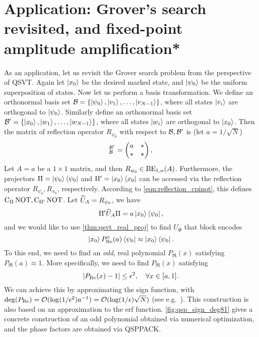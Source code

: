 \section{Application: Grover's search revisited, and fixed-point amplitude amplification*}\label{sec:appqsvt_grover}

As an application, let us revisit the Grover search problem from the perspective of QSVT.
Again let $\ket{x_0}$ be the desired marked state, and $\ket{\psi_0}$ be the uniform superposition of states.
Now let us perform a basis transformation. 
We define an orthonormal basis set $\mathcal{B}=\{\ket{\psi_0},\ket{v_1},\ldots,\ket{v_{N-1}}\}$, where all states $\ket{v_i}$ are orthogonal to $\ket{\psi_0}$. 
Similarly define an orthonormal basis set $\mathcal{B}'=\{\ket{x_0},\ket{w_1},\ldots,\ket{w_{N-1}}\}$, where all states $\ket{w_i}$ are orthogonal to $\ket{x_0}$.
Then the matrix of reflection operator $R_{\psi_0}$ with respect to $\mathcal{B},\mathcal{B'}$ is (let $a=1/\sqrt{N}$)
\begin{equation}
[R_{\psi_0}]_{\mc{B}}^{\mc{B}'}=\begin{pmatrix}
a & *\\
* & *
\end{pmatrix},
\end{equation}
Let $A=a$ be a $1\times 1$ matrix, and then $R_{\psi_0}\in \operatorname{BE}_{1,n}(A)$.
Furthermore, the projectors $\Pi=\ket{\psi_0}\bra{\psi_0}$ and $\Pi'=\ket{x_0}\bra{x_0}$ can be accessed via the reflection operator $R_{\psi_0},R_{x_0}$, respectively.
According to \cref{eqn:reflection_cpinot}, this defines $\operatorname{C}_{\Pi}\operatorname{NOT},\operatorname{C}_{\Pi'}\operatorname{NOT}$.
Let $\widetilde{U}_A=R_{\psi_0}$, we have
\begin{equation}
\Pi' \widetilde{U}_A\Pi=a\ket{x_0}\bra{\psi_0},
\end{equation}
and we would like to use \cref{thm:qsvt_real_proj} to find $U_{\Phi}$ that block encodes
\begin{equation}
\ket{x_0}P_{\operatorname{Re}}^{\diamond}(a)\bra{\psi_0}\approx \ket{x_0}\bra{\psi_0}.
\end{equation}
To this end, we need to find an \emph{odd}, real polynomial $P_{\Re}(x)$ satisfying $P_{\Re}(a)\approx 1$.
More specifically, we need to find $P_{\Re}(x)$ satisfying
\begin{equation}
\left\lvert P_{\operatorname{Re}}(x)-1\right\rvert\le \epsilon^2, \quad \forall x\in [a,1].
\end{equation}
We can achieve this by approximating the sign function, with $\deg(P_{\operatorname{Re}})=\mathcal{O}(\log(1/\epsilon^2) a^{-1})=\mathcal{O}(\log(1/\epsilon)\sqrt{N})$ (see e.g.~\cite[Corollary 6]{LowChuang2017a}). 
This construction is also based on an approximation to the $\mathrm{erf}$ function.
\cref{fig:qsp_sign_deg81} gives a concrete construction of an odd polynomial obtained via numerical optimization, and the phase factors are obtained via QSPPACK.


